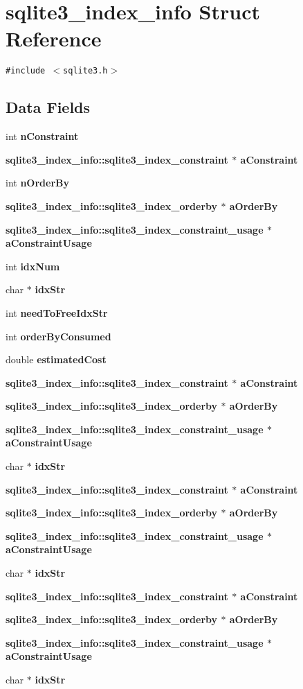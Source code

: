 \section{sqlite3\_\-index\_\-info Struct Reference}
\label{structsqlite3__index__info}
{\tt \#include $<$sqlite3.h$>$}

\subsection*{Data Fields}
\begin{CompactItemize}
\item 
int \bf{n\-Constraint}
\item 
\bf{sqlite3\_\-index\_\-info::sqlite3\_\-index\_\-constraint} $\ast$ \bf{a\-Constraint}
\item 
int \bf{n\-Order\-By}
\item 
\bf{sqlite3\_\-index\_\-info::sqlite3\_\-index\_\-orderby} $\ast$ \bf{a\-Order\-By}
\item 
\bf{sqlite3\_\-index\_\-info::sqlite3\_\-index\_\-constraint\_\-usage} $\ast$ \bf{a\-Constraint\-Usage}
\item 
int \bf{idx\-Num}
\item 
char $\ast$ \bf{idx\-Str}
\item 
int \bf{need\-To\-Free\-Idx\-Str}
\item 
int \bf{order\-By\-Consumed}
\item 
double \bf{estimated\-Cost}
\item 
\bf{sqlite3\_\-index\_\-info::sqlite3\_\-index\_\-constraint} $\ast$ \bf{a\-Constraint}
\item 
\bf{sqlite3\_\-index\_\-info::sqlite3\_\-index\_\-orderby} $\ast$ \bf{a\-Order\-By}
\item 
\bf{sqlite3\_\-index\_\-info::sqlite3\_\-index\_\-constraint\_\-usage} $\ast$ \bf{a\-Constraint\-Usage}
\item 
char $\ast$ \bf{idx\-Str}
\item 
\bf{sqlite3\_\-index\_\-info::sqlite3\_\-index\_\-constraint} $\ast$ \bf{a\-Constraint}
\item 
\bf{sqlite3\_\-index\_\-info::sqlite3\_\-index\_\-orderby} $\ast$ \bf{a\-Order\-By}
\item 
\bf{sqlite3\_\-index\_\-info::sqlite3\_\-index\_\-constraint\_\-usage} $\ast$ \bf{a\-Constraint\-Usage}
\item 
char $\ast$ \bf{idx\-Str}
\item 
\bf{sqlite3\_\-index\_\-info::sqlite3\_\-index\_\-constraint} $\ast$ \bf{a\-Constraint}
\item 
\bf{sqlite3\_\-index\_\-info::sqlite3\_\-index\_\-orderby} $\ast$ \bf{a\-Order\-By}
\item 
\bf{sqlite3\_\-index\_\-info::sqlite3\_\-index\_\-constraint\_\-usage} $\ast$ \bf{a\-Constraint\-Usage}
\item 
char $\ast$ \bf{idx\-Str}
\end{CompactItemize}
